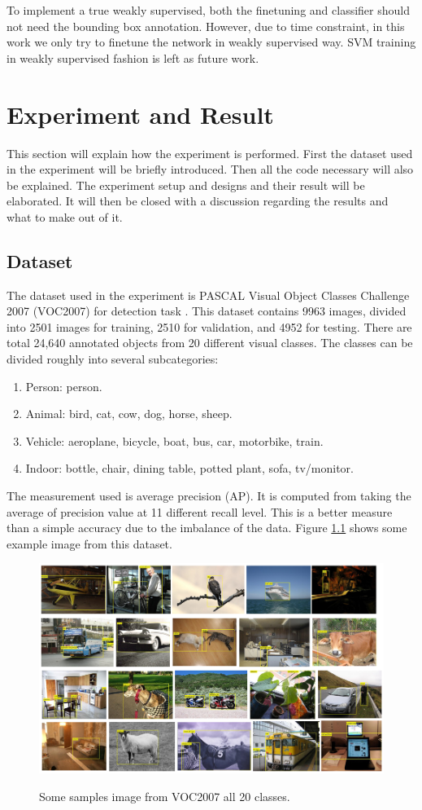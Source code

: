 \documentclass[a4paper,11pt]{kth-mag}
\begin{document}
To implement a true weakly supervised, both the finetuning and classifier should not need the bounding box annotation. However, due to time constraint, in this work we only try to finetune the network in weakly supervised way. SVM training in weakly supervised fashion is left as future work.


\chapter{Experiment and Result}
This section will explain how the experiment is performed. First the dataset used in the experiment will be briefly introduced. Then all the code necessary will also be explained. The experiment setup and designs and their result will be elaborated. It will then be closed with a discussion regarding the results and what to make out of it.

\section{Dataset}
The dataset used in the experiment is PASCAL Visual Object Classes Challenge 2007 (VOC2007) for detection task \cite{pascal2007}. This dataset contains 9963 images, divided into 2501 images for training, 2510 for validation, and 4952 for testing. There are total 24,640 annotated objects from 20 different visual classes. The classes can be divided roughly into several subcategories:
\begin{enumerate}
\item Person: person.
\item Animal: bird, cat, cow, dog, horse, sheep.
\item Vehicle: aeroplane, bicycle, boat, bus, car, motorbike, train.
\item Indoor: bottle, chair, dining table, potted plant, sofa, tv/monitor.
\end{enumerate}

The measurement used is average precision (AP). It is computed from taking the average of precision value at 11 different recall level. This is a better measure than a simple accuracy due to the imbalance of the data. Figure \ref{fig:pascal} shows some example image from this dataset.

\begin{figure}
\centering
\includegraphics[scale=0.5]{image/pascal_samples.png}
\label{fig:pascal}
\caption{Some samples image from VOC2007 all 20 classes.}
\end{figure}
\end{document}
